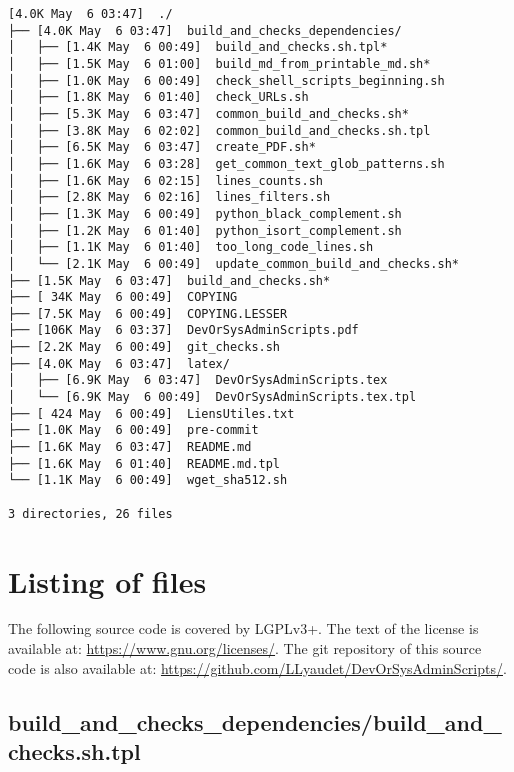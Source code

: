 \documentclass{article}
\begin{document}
\begin{verbatim}
[4.0K May  6 03:47]  ./
├── [4.0K May  6 03:47]  build_and_checks_dependencies/
│   ├── [1.4K May  6 00:49]  build_and_checks.sh.tpl*
│   ├── [1.5K May  6 01:00]  build_md_from_printable_md.sh*
│   ├── [1.0K May  6 00:49]  check_shell_scripts_beginning.sh
│   ├── [1.8K May  6 01:40]  check_URLs.sh
│   ├── [5.3K May  6 03:47]  common_build_and_checks.sh*
│   ├── [3.8K May  6 02:02]  common_build_and_checks.sh.tpl
│   ├── [6.5K May  6 03:47]  create_PDF.sh*
│   ├── [1.6K May  6 03:28]  get_common_text_glob_patterns.sh
│   ├── [1.6K May  6 02:15]  lines_counts.sh
│   ├── [2.8K May  6 02:16]  lines_filters.sh
│   ├── [1.3K May  6 00:49]  python_black_complement.sh
│   ├── [1.2K May  6 01:40]  python_isort_complement.sh
│   ├── [1.1K May  6 01:40]  too_long_code_lines.sh
│   └── [2.1K May  6 00:49]  update_common_build_and_checks.sh*
├── [1.5K May  6 03:47]  build_and_checks.sh*
├── [ 34K May  6 00:49]  COPYING
├── [7.5K May  6 00:49]  COPYING.LESSER
├── [106K May  6 03:37]  DevOrSysAdminScripts.pdf
├── [2.2K May  6 00:49]  git_checks.sh
├── [4.0K May  6 03:47]  latex/
│   ├── [6.9K May  6 03:47]  DevOrSysAdminScripts.tex
│   └── [6.9K May  6 00:49]  DevOrSysAdminScripts.tex.tpl
├── [ 424 May  6 00:49]  LiensUtiles.txt
├── [1.0K May  6 00:49]  pre-commit
├── [1.6K May  6 03:47]  README.md
├── [1.6K May  6 01:40]  README.md.tpl
└── [1.1K May  6 00:49]  wget_sha512.sh

3 directories, 26 files
\end{verbatim}

\section{Listing of files}
\label{section:listing}

The following source code is covered by LGPLv3+.
The text of the license is available at:
\url{https://www.gnu.org/licenses/}.
The git repository of this source code is also available at:
\url{https://github.com/LLyaudet/DevOrSysAdminScripts/}.


\subsection{
  build\_and\_checks\_dependencies/build\_and\_checks.sh.tpl
}
\label{
  build_and_checks_dependencies:build_and_checksshtpl
}

\end{document}
